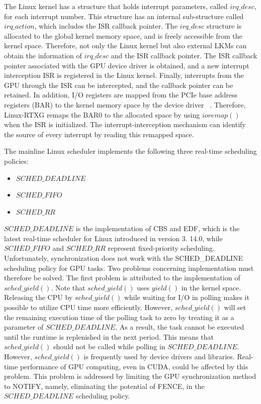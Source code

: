 The Linux kernel has a structure that holds interrupt parameters, called $irq\_desc$, for each interrupt number.
This structure has an internal sub-structure called $irq\_action$, which includes the ISR callback pointer.
The $irq\_desc$ structure is allocated to the global kernel memory space, and is freely accessible from the kernel space.
Therefore, not only the Linux kernel but also external LKMs can obtain the information of $irq\_desc$ and the ISR callback pointer.
The ISR callback pointer associated with the GPU device driver is obtained, and a new interrupt interception ISR is registered in the Linux kernel.
Finally, interrupts from the GPU through the ISR can be intercepted, and the callback pointer can be retained.
In addition, I/O registers are mapped from the PCIe base address registers (BAR) to the kernel memory space by the device driver ~\cite{fujii:icpads2013,kato2013zero}.
Therefore, Linux-RTXG remaps the BAR0 to the allocated space by using $ioremap()$ when the ISR is initialized.
The interrupt-interception mechanism can identify the source of every interrupt by reading this remapped space.


The mainline Linux scheduler implements the following three real-time scheduling policies:
\begin{itemize}
\item $SCHED\_DEADLINE$
\item $SCHED\_FIFO$
\item $SCHED\_RR$
\end{itemize}

$SCHED\_DEADLINE$ is the implementation of CBS and EDF, which is the latest real-time scheduler for Linux introduced in version 3.
14.0, while $SCHED\_FIFO$ and $SCHED\_RR$ represent fixed-priority scheduling.
Unfortunately, synchronization does not work with the SCHED\_DEADLINE scheduling policy for GPU tasks.
Two problems concerning implementation must therefore be solved.
The first problem is attributed to the implementation of $sched\_yield()$.
Note that $sched\_yield()$ uses $yield()$ in the kernel space.
Releasing the CPU by $sched\_yield()$ while waiting for I/O in polling makes it possible to utilize CPU time more efficiently.
However, $sched\_yield()$ will set the remaining execution time of the polling task to zero by treating it as a parameter of $SCHED\_DEADLINE$.
As a result, the task cannot be executed until the runtime is replenished in the next period.
This means that $sched\_yield()$ should not be called while polling in $SCHED\_DEADLINE$.
However, $sched\_yield()$ is frequently used by device drivers and libraries.
Real-time performance of GPU computing, even in CUDA, could be affected by this problem.
This problem is addressed by limiting the GPU synchronization method to NOTIFY, namely, eliminating the potential of FENCE, in the $SCHED\_DEADLINE$ scheduling policy.

